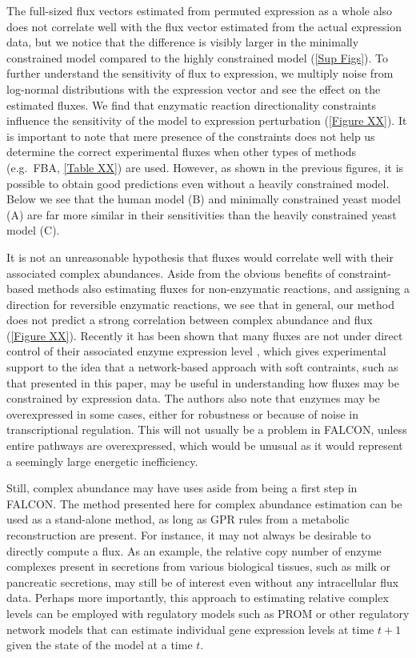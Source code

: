 The full-sized flux vectors estimated from permuted expression as a
whole also does not correlate well with the flux vector estimated from
the actual expression data, but we notice that the difference is
visibly larger in the minimally constrained model compared to the
highly constrained model (\ref{Sup Figs}). To further understand the
sensitivity of flux to expression, we multiply noise from log-normal
distributions with the expression vector and see the effect on the
estimated fluxes. We find that enzymatic reaction directionality
constraints influence the sensitivity of the model to expression
perturbation (\ref{Figure XX}). It is important to note that mere
presence of the constraints does not help us determine the correct
experimental fluxes when other types of methods (e.g.\ FBA, \ref{Table
  XX}) are used. However, as shown in the previous figures, it is
possible to obtain good predictions even without a heavily constrained
model. Below we see that the human model (B) and minimally constrained
yeast model (A) are far more similar in their sensitivities than the
heavily constrained yeast model (C).

It is not an unreasonable hypothesis that fluxes would correlate well
with their associated complex abundances. Aside from the obvious benefits
of constraint-based methods also estimating fluxes for non-enzymatic
reactions, and assigning a direction for reversible enzymatic
reactions, we see that in general, our method does not predict a
strong correlation between complex abundance and flux
(\ref{Figure XX}). Recently it has been shown that many fluxes are not
under direct control of their associated enzyme expression
level \citep{Chubukov2013}, which gives experimental support to the
idea that a network-based approach with soft contraints, such as that
presented in this paper, may be useful in understanding how fluxes may
be constrained by expression data. The authors also note that enzymes
may be overexpressed in some cases, either for robustness or because
of noise in transcriptional regulation. This will not usually be a
problem in FALCON, unless entire pathways are overexpressed, which
would be unusual as it would represent a seemingly large energetic
inefficiency.

Still, complex abundance may have uses aside from being a first
step in FALCON. The method presented here for complex abundance
estimation can be used as a stand-alone method, as long as GPR
rules from a metabolic reconstruction are present. For instance, it
may not always be desirable to directly compute a flux. As an example,
the relative copy number of enzyme complexes present in secretions
from various biological tissues, such as milk or pancreatic
secretions, may still be of interest even without any intracellular
flux data.  Perhaps more importantly, this approach to estimating
relative complex levels can be employed with regulatory models such as
PROM \citep{Chandrasekaran2010a} or other regulatory network models
that can estimate individual gene expression levels at time $t+1$
given the state of the model at a time $t$.

